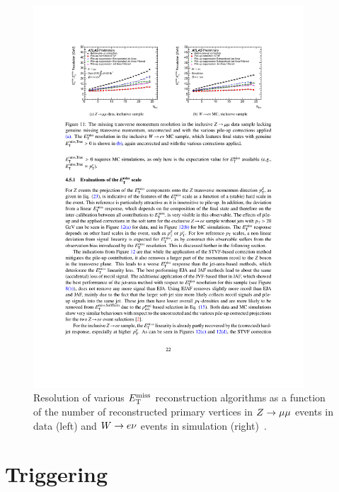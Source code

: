 \begin{figure}[tp]
  \centering
  \includegraphics[width=0.90\textwidth]{figures/performance/met-resolutionvsnpv}
  \caption{Resolution of various $E_{\mathrm{T}}^{\mathrm{miss}}$ reconstruction algorithms as a function of the number of reconstructed primary vertices in $Z \rightarrow \mu\mu$ events in data (left) and $W \rightarrow e\nu$ events in simulation (right)~\cite{ATLAS-CONF-2014-019}.}
  \label{fig:objects-met-resolution}
\end{figure}

\section{Triggering}

